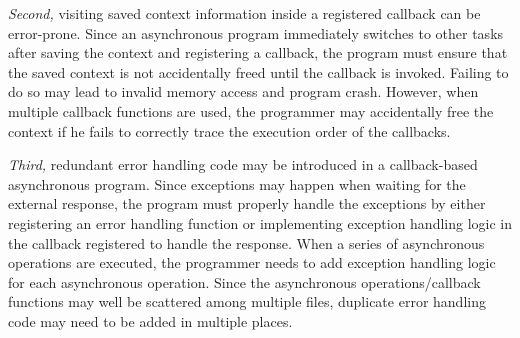 \textit{Second,} visiting saved context information inside a registered callback can be error-prone. Since an asynchronous program immediately switches to other tasks after saving the context and registering a callback, the program must ensure that the saved context is not accidentally freed until the callback is invoked. Failing to do so may lead to invalid memory access and program crash. However, when multiple callback functions are used, the programmer may accidentally free the context if he fails to correctly trace the execution order of the callbacks.

\textit{Third,} redundant error handling code may be introduced in a callback-based asynchronous program. Since exceptions may happen when waiting for the external response, the program must properly handle the exceptions by either registering an error handling function or implementing exception handling logic in the callback registered to handle the response. When a series of asynchronous operations are executed, the programmer needs to add exception handling logic for each asynchronous operation. %
 Since the asynchronous operations/callback functions may well be scattered among multiple files, duplicate error handling code may need to be added in multiple places.



